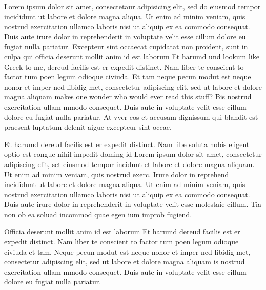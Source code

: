 \documentclass[11pt]{report}
\begin{document}

\maketitle


Lorem ipsum dolor sit amet, consectetaur adipisicing elit, sed do
eiusmod tempor incididunt ut labore et dolore magna aliqua.  Ut enim ad
minim veniam, quis nostrud exercitation ullamco laboris nisi ut
aliquip ex ea commodo consequat.  Duis aute irure dolor in
reprehenderit in voluptate velit esse cillum dolore eu fugiat nulla
pariatur.  Excepteur sint occaecat cupidatat non proident, sunt in
culpa qui officia deserunt mollit anim id est laborum Et harumd und
lookum like Greek to me, dereud facilis est er expedit distinct.  Nam
liber te conscient to factor tum poen legum odioque civiuda.  Et tam
neque pecun modut est neque nonor et imper ned libidig met,
consectetur adipiscing elit, sed ut labore et dolore magna aliquam
makes one wonder who would ever read this stuff? Bis nostrud
exercitation ullam mmodo consequet.  Duis aute in voluptate velit esse
cillum dolore eu fugiat nulla pariatur.  At vver eos et accusam
dignissum qui blandit est praesent luptatum delenit aigue excepteur
sint occae. 

Et harumd dereud facilis est er expedit distinct.  Nam libe soluta
nobis eligent optio est congue nihil impedit doming id Lorem ipsum
dolor sit amet, consectetur adipiscing elit, set eiusmod tempor
incidunt et labore et dolore magna aliquam.  Ut enim ad minim veniam,
quis nostrud exerc.  Irure dolor in reprehend incididunt ut labore et
dolore magna aliqua.  Ut enim ad minim veniam, quis nostrud
exercitation ullamco laboris nisi ut aliquip ex ea commodo consequat.
Duis aute irure dolor in reprehenderit in voluptate velit esse
molestaie cillum.  Tia non ob ea soluad incommod quae egen ium improb
fugiend.

\begin{danger}
Officia deserunt mollit anim id est laborum Et harumd dereud facilis
est er expedit distinct.  Nam liber te conscient to factor tum poen
legum odioque civiuda et tam.  Neque pecun modut est neque nonor et
imper ned libidig met, consectetur adipiscing elit, sed ut labore et
dolore magna aliquam is nostrud exercitation ullam mmodo consequet.
Duis aute in voluptate velit esse cillum dolore eu fugiat nulla
pariatur.
\end{danger}
\end{document}
